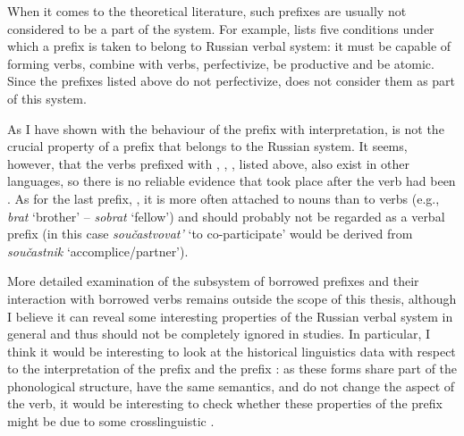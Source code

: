 When it comes to the theoretical literature, such prefixes are usually not considered to be a part of the system. For example, \citet[101-105]{Krongauz:98} lists five conditions under which a prefix is taken to belong to Russian verbal  system: it must be capable of forming verbs, combine with verbs, perfectivize, be productive and be atomic. Since the prefixes listed above do not perfectivize, \citet[103]{Krongauz:98} does not consider them as part of this system.

As I have shown with the behaviour of the prefix  with  interpretation,  is not the crucial property of a prefix that belongs to the Russian  system. It seems, however, that the verbs prefixed with , , , listed above, also exist in other languages, so there is no reliable evidence that  took place after the verb had been . As for the last prefix, , it is more often attached to nouns than to verbs (e.g., \textit{brat} `brother' -- \textit{sobrat} `fellow') and should probably not be regarded as a verbal prefix (in this case \textit{sou\v{c}astvovat'} `to co-participate' would be derived from \textit{sou\v{c}astnik} `accomplice/partner'). 

More detailed examination of the subsystem of borrowed prefixes and their interaction with borrowed verbs remains outside the scope of this thesis, although I believe it can reveal some interesting properties of the Russian verbal  system in general and thus should not be completely ignored in  studies. In particular, I think it would be interesting to look at the historical linguistics data with respect to the  interpretation of the prefix  and the  prefix : as these forms share part of the phonological structure, have the same semantics, and do not change the aspect of the verb, it would be interesting to check whether these properties of the  prefix  might be due to some crosslinguistic . 


